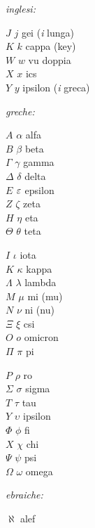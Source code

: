 \emph{inglesi:}
\begin{center}
\begin{minipage}{3cm}
$J$ $j$ gei (\emph{i} lunga) \\
$K$ $k$ cappa (key) \\
$W$ $w$ vu doppia \\
$X$ $x$ ics \\
$Y$ $y$ ipsilon (\emph{i} greca) 
\end{minipage}
\end{center}
%
\emph{greche:}
\begin{center}
\begin{minipage}{3cm}
$A$ $\alpha$ alfa \index{$\alpha$} \\
$B$ $\beta$ beta \index{$\beta$}\\
$\Gamma$ $\gamma$ gamma \index{$\gamma$} \\
$\Delta$ $\delta$ delta \index{$\delta$} \\
$E$ $\eps$ epsilon \index{$\eps$} \\
$Z$ $\zeta$ zeta\footnotemark[1] \\
$H$ $\eta$ eta  \\
$\Theta$ $\theta$ teta \index{$\theta$}
\end{minipage}%
\begin{minipage}{3cm}
$I$ $\iota$ iota  \\
$K$ $\kappa$ kappa\footnotemark[2]  \\
$\Lambda$ $\lambda$ lambda \index{$\lambda$} \\
$M$ $\mu$ mi (mu) \index{$\mu$} \\
$N$ $\nu$ ni (nu) \index{$\nu$} \\
$\Xi$ $\xi$ csi  \\
$O$ $o$ omicron  \\
$\Pi$ $\pi$ pi\footnotemark[3] \index{$\pi$}
\end{minipage}%
%
\begin{minipage}{3cm}
$P$ $\rho$ ro \index{$\rho$} \\
$\Sigma$ $\sigma$ sigma \index{$\sigma$} \index{$\Sigma$} \\
$T$ $\tau$ tau  \index{$\tau$}\\
$Y$ $\upsilon$ ipsilon\footnotemark[4]\\
$\Phi$ $\phi$ fi \index{$\phi$} \\
$X$ $\chi$ chi \index{$\chi$} \\
$\Psi$ $\psi$ psi \index{$\psi$} \\
$\Omega$ $\omega$ omega \index{$\omega$}
\end{minipage}
\end{center}
%
\emph{ebraiche:}
\begin{center}
\begin{minipage}{3cm}
$\aleph$ alef
\end{minipage}
\end{center}

